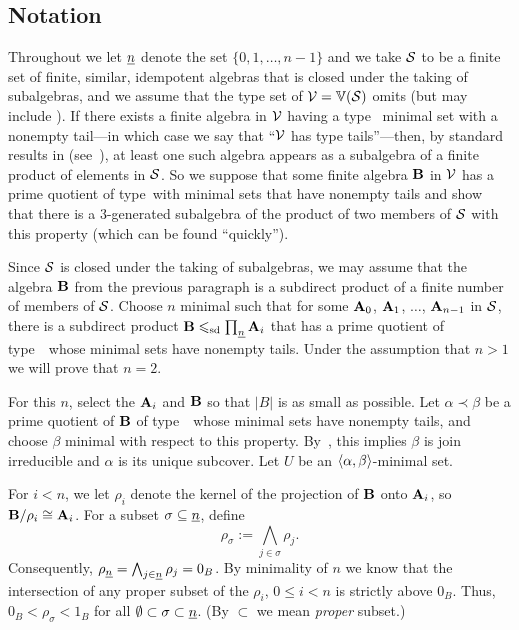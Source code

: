 \documentclass{ws-ijac}
\begin{document}
\subsection{Notation}
Throughout we let $\underline{n}$ denote the set $\{0,1,\dots, n-1\}$ and
we take $\mathcal{S}$ to be a finite set of finite,
similar, idempotent algebras that is closed under the taking of
subalgebras, and we assume that the type set of
$\mathcal{V} = \operatorname{\mathbb{V}}(\mathcal{S})$ omits \utyp (but may include \styp).
If there exists a finite algebra in $\mathcal{V}$ having a type \atyp\ minimal
set with a nonempty tail---in which case we say that
``$\mathcal{V}$ has type \atyp tails''---then,
by standard results in \tct (see~\cite{HM:1988}),
at least one such algebra appears as a subalgebra of a finite product of
elements in $\mathcal{S}$.
So we suppose that some finite algebra
$\mathbf{B}$ in $\mathcal{V}$ has a prime quotient of type~\atyp with
minimal sets that have
nonempty tails and show that there is a 3-generated
subalgebra of the
product of two members of $\mathcal{S}$ with this property (which can be found ``quickly'').

Since $\mathcal{S}$ is closed under the taking of subalgebras,
we may assume that the algebra $\mathbf{B}$ from the previous paragraph is a subdirect
product of a finite number of members of $\mathcal{S}$. Choose $n$ minimal such that for
some $\mathbf{A}_0$, $\mathbf{A}_1$, $\dots$, $\mathbf{A}_{n-1}$ in $\mathcal{S}$, there is a subdirect
product $\mathbf{B} \leqslant_{\mathrm{sd}} \prod_{\underline{n}} \mathbf{A}_i$
that has a prime quotient of type~\atyp\ whose minimal sets have
nonempty tails.
Under the assumption that $n > 1$ we will prove that $n = 2$.

For this $n$, select the $\mathbf{A}_i$ and $\mathbf{B}$ so that $|B|$ is as small as possible.
Let $\alpha \prec \beta$ be a prime quotient of $\mathbf{B}$
of type~\atyp\ whose minimal sets have
nonempty tails, and choose $\beta$ minimal with respect to this property.
By~\cite[Lemma 6.2]{HM:1988}, this implies $\beta$ is join
irreducible and $\alpha$ is its unique subcover.
Let $U$ be an $\langle\alpha, \beta\rangle$-minimal set.

For $i < n$, we let $\rho_i$ denote the kernel of the projection
of $\mathbf{B}$ onto $\mathbf{A}_i$, so $\mathbf{B}/\rho_i \cong \mathbf{A}_i$.
For a subset $\sigma \subseteq \underline{n}$, define
\[
\rho_\sigma := \bigwedge_{j\in \sigma} \rho_j.
\]
Consequently,
$\rho_{\underline{n}} = \bigwedge_{j\in \underline{n}}\rho_j = 0_{B}$.
By minimality of $n$ we know that the intersection of any  proper subset of the
$\rho_i$, $0\leq i < n$ is strictly above $0_B$.  Thus,
$0_B < \rho_\sigma < 1_B$ for all
$\emptyset \subset \sigma\subset \underline{n}$.
(By $\subset$ we mean \emph{proper} subset.)
\end{document}

